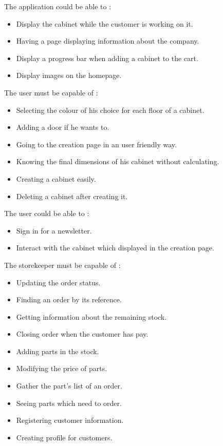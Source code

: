 \documentclass[12pt,oneside]{report}
\begin{document}
    The application could be able to :
    \begin{itemize}
        \item Display the cabinet while the customer is working on it.
        \item Having a page displaying information about the company.
        \item Display a progress bar when adding a cabinet to the cart. 
        \item Display images on the homepage.
    \end{itemize}
    \vspace{\baselineskip}
    
    The user must be capable of :
    \begin{itemize}
        \item Selecting the colour of his choice for each floor of a cabinet.
        \item Adding a door if he wants to.
        \item Going to the creation page in an user friendly way.
        \item Knowing the final dimensions of his cabinet without calculating.
        \item Creating a cabinet easily.
        \item Deleting a cabinet after creating it.
    \end{itemize}
    \vspace{\baselineskip}
    
    \newpage
    The user could be able to : 
    \begin{itemize}
        \item Sign in for a newsletter.
        \item Interact with the cabinet which displayed in the creation page.
    \end{itemize}
    \vspace{\baselineskip}

    The storekeeper must be capable of :
    \begin{itemize}
        \item Updating the order status.
        \item Finding an order by its reference.
        \item Getting information about the remaining stock.
        \item Closing order when the customer has pay.
        \item Adding parts in the stock.
        \item Modifying the price of parts.
        \item Gather the part's list of an order.
        \item Seeing parts which need to order.
        \item Registering customer information.
        \item Creating profile for customers.
    \end{itemize}
    \vspace{\baselineskip}
\end{document}
